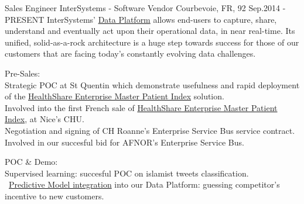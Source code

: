 

\begin{cventries}

  \cventry
    {Sales Engineer} %
    {InterSystems - Software Vendor} %
    {Courbevoie, FR, 92} %
    {Sep.2014 - PRESENT} %
{
InterSystems' \href{https://www.intersystems.com/products/intersystems-iris/}{Data Platform} allows end-users to capture, share, understand and eventually act upon their operational data, in near real-time. Its unified, solid-as-a-rock architecture is a huge step towards success for those of our customers that are facing today's constantly evolving data challenges.
} %
{
      \begin{cvitems} %
        \item {Pre-Sales:\\Strategic POC at St Quentin which demonstrate usefulness and rapid deployment of the \href{https://www.intersystems.com/products/healthshare/patient-index/}{HealthShare Enterprise Master Patient Index} solution.\\Involved into the first French sale of \href{https://www.intersystems.com/products/healthshare/patient-index/}{HealthShare Enterprise Master Patient Index}, at Nice's CHU.\\Negotiation and signing of CH Roanne's Enterprise Service Bus service contract.\\Involved in our succesful bid for AFNOR's Enterprise Service Bus.}
        \item {POC \& Demo:\\Supervised learning: succesful POC on islamist tweets classification.\\ \href{https://learning.intersystems.com/pluginfile.php/15024/mod_resource/content/4/AnInterSystemsGuideToTheDataGalaxy.pdf}{Predictive Model integration} into our Data Platform: guessing competitor's incentive to new customers.}

\end{cvitems}}
\end{cventries}
